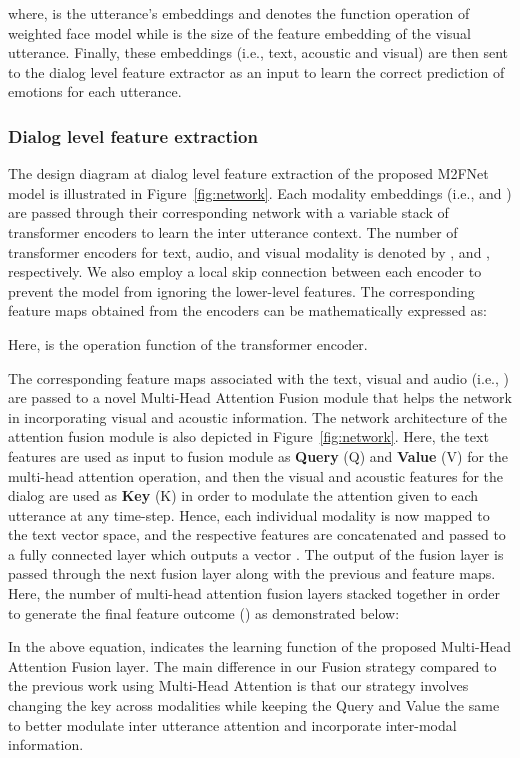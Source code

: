 \documentclass[10pt,twocolumn,letterpaper]{article}
\begin{document}
where,  is the  utterance's embeddings and  denotes the function operation of weighted face model while  is the size of the feature embedding of the visual utterance. 
Finally, these embeddings (i.e., text, acoustic and visual) are then sent to the dialog level feature extractor as an input to learn the correct prediction of emotions for each utterance.

\subsubsection{Dialog level feature extraction}
The design diagram at dialog level feature extraction of the proposed M2FNet model is illustrated in Figure~\ref{fig:network}. Each modality embeddings (i.e.,  and ) are passed through their corresponding network with a variable stack of transformer encoders \cite{transformer} to learn the inter utterance context. The number of transformer encoders for text, audio, and visual modality is denoted by , and , respectively. We also employ a local skip connection between each encoder to prevent the model from ignoring the lower-level features. The corresponding feature maps obtained from the encoders can be mathematically expressed as:

Here,  is the operation function of the transformer encoder.

The corresponding feature maps associated with the text, visual and audio (i.e., ) are passed to a novel Multi-Head Attention Fusion module that helps the network in incorporating visual and acoustic information. The network architecture of the attention fusion module is also depicted in Figure~\ref{fig:network}. Here, the text features  are used as input to fusion module as \textbf{Query} (Q) and \textbf{Value} (V) for the multi-head attention operation, and then the visual  and acoustic  features for the dialog are used as \textbf{Key} (K) in order to modulate the attention given to each utterance at any time-step. Hence, each individual modality is now mapped to the text vector space, and the respective features are concatenated and passed to a fully connected layer which outputs a vector . The output of the fusion layer is passed through the next fusion layer along with the previous  and  feature maps. Here, the  number of multi-head attention fusion layers stacked together in order to generate the final feature outcome () as demonstrated below:

In the above equation,  indicates the learning function of the proposed Multi-Head Attention Fusion layer. 
The main difference in our Fusion strategy compared to the previous work using Multi-Head Attention is that our strategy involves changing the key across modalities while keeping the Query and Value the same to better modulate inter utterance attention and incorporate inter-modal information.
\end{document}
